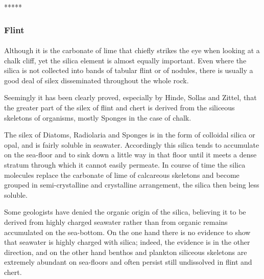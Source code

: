 \documentclass[a4paper, 12pt, oneside]{article}
\begin{document}
\centerline{*\hspace{15mm}*\hspace{15mm}*\hspace{15mm}*\hspace{15mm}*}
\bigskip

\subsubsection{Flint}
\paragraph{}
Although it is the carbonate of lime that chiefly strikes the eye when looking at a chalk cliff, yet the silica element is almost equally important. Even where the silica is not collected into bands of tabular flint or of nodules, there is usually a good deal of silex disseminated throughout the whole rock.

Seemingly it has been clearly proved, especially by Hinde, Sollas and Zittel, that the greater part of the silex of flint and chert is derived from the siliceous skeletons of organisms, mostly Sponges in the case of chalk.

The silex of Diatoms, Radiolaria and Sponges is in the form of colloidal silica or opal, and is fairly soluble in seawater. Accordingly this silica tends to accumulate on the sea-floor and to sink down a little way in that floor until it meets a dense stratum through which it cannot easily permeate. In course of time the silica molecules replace the carbonate of lime of calcareous skeletons and become grouped in semi-crystalline and crystalline arrangement, the silica then being less soluble.

Some geologists have denied the organic origin of the silica, believing it to be derived from highly charged seawater rather than from organic remains accumulated on the sea-bottom. On the one hand there is no evidence to show that seawater is highly charged with silica; indeed, the evidence is in the other direction, and on the other hand benthos and plankton siliceous skeletons are extremely abundant on sea-floors and often persist still undissolved in flint and chert.
\end{document}
